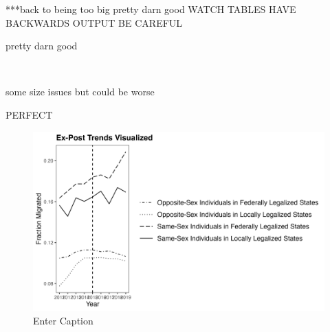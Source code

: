 \documentclass[]{article}
\begin{document}
***back to being too big
        \scalebox{1}{}
pretty darn good
WATCH TABLES HAVE BACKWARDS OUTPUT BE CAREFUL
\clearpage


pretty darn good

\clearpage
{} \\ 
\begin{landscape}
\begin{center}

\end{center}
\end{landscape}
some size issues but could be worse

\clearpage

\begin{landscape}
\begin{center}

\end{center}
\end{landscape}
PERFECT

\clearpage

\begin{figure}
    \centering
    \includegraphics[width=1\linewidth]{outputs/summary_stats/post_trends.png}
    \caption{Enter Caption}
    \label{fig:enter-label}
\end{figure}
\end{document}
